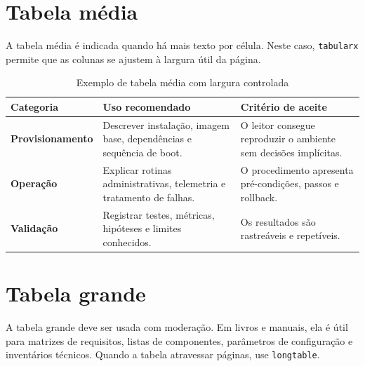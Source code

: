 \section{Tabela média}

A tabela média é indicada quando há mais texto por célula. Neste caso, \texttt{tabularx} permite que as colunas se ajustem à largura útil da página.

\begin{table}[htbp]
\centering
\caption{Exemplo de tabela média com largura controlada}
\label{tab:media}
\begin{tabularx}{\textwidth}{>{\bfseries}p{}X X}
\toprule
Categoria & Uso recomendado & Critério de aceite \\
\midrule
Provisionamento & Descrever instalação, imagem base, dependências e sequência de boot. & O leitor consegue reproduzir o ambiente sem decisões implícitas. \\
Operação & Explicar rotinas administrativas, telemetria e tratamento de falhas. & O procedimento apresenta pré-condições, passos e rollback. \\
Validação & Registrar testes, métricas, hipóteses e limites conhecidos. & Os resultados são rastreáveis e repetíveis. \\
\bottomrule
\end{tabularx}
\end{table}

\section{Tabela grande}

A tabela grande deve ser usada com moderação. Em livros e manuais, ela é útil para matrizes de requisitos, listas de componentes, parâmetros de configuração e inventários técnicos. Quando a tabela atravessar páginas, use \texttt{longtable}.

